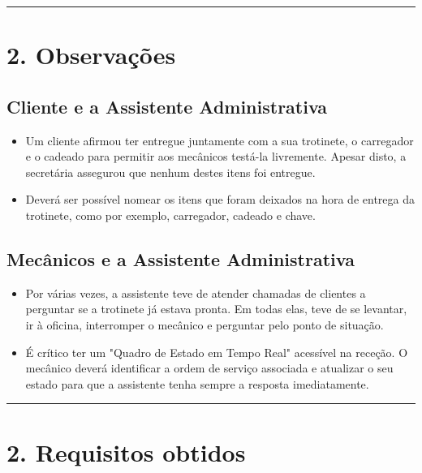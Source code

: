 \documentclass[11pt,a4paper]{article}
\newcommand{\pergunta}[1]{\item[O:] #1}
\newcommand{\resposta}[1]{\item[R:] #1}
\begin{document}
	\vspace{0.5cm}
	\hrule %


	
	\section*{2. Observações}
	
	\subsection*{Cliente e a Assistente Administrativa}
	\begin{itemize}
		
		\pergunta Um cliente afirmou ter entregue juntamente com a sua trotinete, o carregador e o cadeado para permitir aos mecânicos testá-la livremente. Apesar disto, a secretária assegurou que nenhum destes itens foi entregue.
		
		\resposta Deverá ser possível nomear os itens que foram deixados na hora de entrega da trotinete, como por exemplo, carregador, cadeado e chave.
	
	\end{itemize}

	\subsection*{Mecânicos e a Assistente Administrativa}
	\begin{itemize}
	
	\pergunta Por várias vezes, a assistente teve de atender chamadas de clientes a perguntar se a trotinete já estava pronta. Em todas elas, teve de se levantar, ir à oficina, interromper o mecânico e perguntar pelo ponto de situação.
	
	\resposta É crítico ter um "Quadro de Estado em Tempo Real" \space acessível na receção. O mecânico deverá identificar a ordem de serviço associada e atualizar o seu estado para que a assistente tenha sempre a resposta imediatamente.
		
	\end{itemize}
	
	
	\vspace{0.8cm}
	
	\hrule %
	\vspace{0.2cm}
	
	\section*{2. Requisitos obtidos}
	
\end{document}
